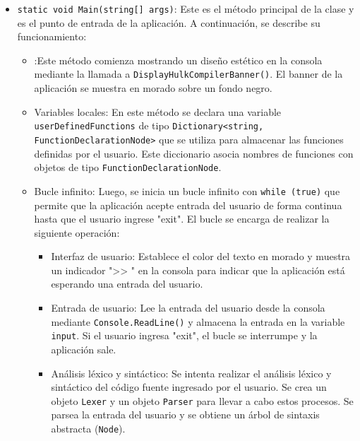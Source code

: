 \documentclass{article}
\begin{document}
\begin{itemize}[left=0pt]
    \item \textcolor{fieldcolor}{\lstinline{static void Main(string[] args)}}: Este es el método principal de la clase y es el punto de entrada de la aplicación. A continuación, se describe su funcionamiento:

    \begin{itemize}
        \item \textcolor{commentcolor}{}:Este método comienza mostrando un diseño estético en la consola mediante la llamada a \textcolor{methodcolor}{\lstinline{DisplayHulkCompilerBanner()}}. El banner de la aplicación se muestra en morado sobre un fondo negro.

        \item \textcolor{commentcolor}{Variables locales}: En este método se declara una variable \textcolor{fieldcolor}{\lstinline{userDefinedFunctions}} de tipo \textcolor{fieldcolor}{\lstinline{Dictionary<string, FunctionDeclarationNode>}} que se utiliza para almacenar las funciones definidas por el usuario. Este diccionario asocia nombres de funciones con objetos de tipo \textcolor{classcolor}{\lstinline{FunctionDeclarationNode}}.

        \item \textcolor{commentcolor}{Bucle infinito}: Luego, se inicia un bucle infinito con \textcolor{fieldcolor}{\lstinline{while (true)}} que permite que la aplicación acepte entrada del usuario de forma continua hasta que el usuario ingrese "exit". El bucle se encarga de realizar la siguiente operación:

        \begin{itemize}
            \item \textcolor{commentcolor}{Interfaz de usuario}: Establece el color del texto en morado y muestra un indicador ">> " en la consola para indicar que la aplicación está esperando una entrada del usuario.

            \item \textcolor{commentcolor}{Entrada de usuario}: Lee la entrada del usuario desde la consola mediante \textcolor{fieldcolor}{\lstinline{Console.ReadLine()}} y almacena la entrada en la variable \textcolor{fieldcolor}{\lstinline{input}}. Si el usuario ingresa "exit", el bucle se interrumpe y la aplicación sale.

            \item \textcolor{commentcolor}{Análisis léxico y sintáctico}: Se intenta realizar el análisis léxico y sintáctico del código fuente ingresado por el usuario. Se crea un objeto \textcolor{classcolor}{\lstinline{Lexer}} y un objeto \textcolor{classcolor}{\lstinline{Parser}} para llevar a cabo estos procesos. Se parsea la entrada del usuario y se obtiene un árbol de sintaxis abstracta (\textcolor{fieldcolor}{\lstinline{Node}}).


\end{itemize}
\end{itemize}
\end{itemize}
\end{document}
